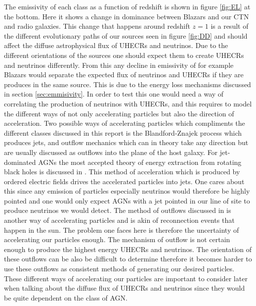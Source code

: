 The emissivity of each class as a function of redshift is shown in figure \ref*{fig:EL} at the bottom. Here it shows a change in dominance between Blazars and our CTN and radio galaxies.
This change that happens around redshift $z=1$ is a result of the different evolutionary paths of our sources seen in figure \ref*{fig:DD} and should affect the diffuse astrophysical flux of UHECRs and neutrinos. 
Due to the different orientations of the sources one should expect them to create UHECRs and neutrinos differently. From this any decline in emissivity of for example Blazars would separate the expected flux of neutrinos and UHECRs if they are produces in the same source. This is due to the energy loss mechanisms 
discussed in section \ref{sec:emmisivity}. In order to test this one would need a way of correlating the production of neutrinos with UHECRs, and this requires to model the different ways of not only accelerating particles but also the direction of acceleration. 
Two possible ways of accelerating particles which compliments the different classes discussed in this report is the Blandford-Znajek process which produces jets, and outflow mechanics which can in theory take any direction but are usually discussed as outflows into the plane of the host galaxy.
For jet-dominated AGNs the most accepted theory of energy extraction from rotating black holes is discussed in \cite{Blandford_1977}. This method of acceleration which is produced by ordered electric fields drives the accelerated particles into jets. One cares about this since any emission of particles especially neutrinos would therefore be highly pointed and one would only expect 
AGNs with a jet pointed in our line of site to produce neutrinos we would detect. 
The method of outflows discussed in \cite{Laha_2021} is another way of accelerating particles \colorbox{BurntOrange}{and is akin of reconnection events that happen in the sun}. The problem one faces here is 
therefore the uncertainty of accelerating our particles enough. The mechanism of outflow is not certain enough to produce the highest energy UHECRs and neutrinos. The orientation of these outflows can be also be difficult to determine therefore it becomes harder to use these outflows as consistent methods of generating our desired particles.
These different ways of accelerating our particles are important to consider later when talking about the diffuse flux of UHECRs and neutrinos since they would be quite dependent on the class of AGN.


